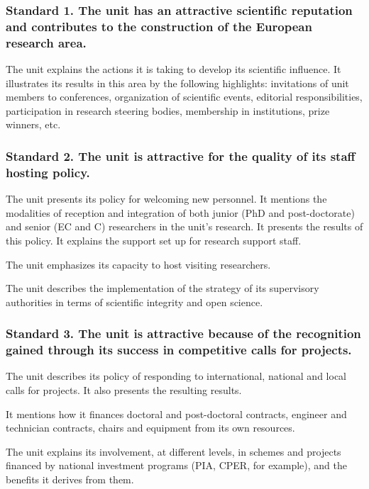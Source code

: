 \subsubsection*{Standard 1. The unit has an attractive scientific reputation and
contributes to the construction of the European research area.%
}

\begin{hceresinstructions}
  The unit explains the actions it is taking to develop its scientific
  influence. It illustrates its results in this area by the following
  highlights: invitations of unit members to conferences, organization of
  scientific events, editorial responsibilities, participation in research
  steering bodies, membership in institutions, prize winners, etc.
\end{hceresinstructions}

\subsubsection*{Standard 2. The unit is attractive for the quality of its staff
hosting policy.}

\begin{hceresinstructions}
  The unit presents its policy for welcoming new personnel. It mentions
  the modalities of reception and integration of both junior (PhD and
  post-doctorate) and senior (EC and C) researchers in the
  unit's research. It presents the results of this policy.
  It explains the support set up for research support staff.

  The unit emphasizes its capacity to host visiting researchers.

  The unit describes the implementation of the strategy of its supervisory
  authorities in terms of scientific integrity and open science.
\end{hceresinstructions}

\subsubsection*{Standard 3. The unit is attractive because of the recognition
gained through its success in competitive calls for projects.%
}

\begin{hceresinstructions}
  The unit describes its policy of responding to international, national
  and local calls for projects. It also presents the resulting results.

  It mentions how it finances doctoral and post-doctoral contracts,
  engineer and technician contracts, chairs and equipment from its own
  resources.

  The unit explains its involvement, at different levels, in schemes and
  projects financed by national investment programs (PIA, CPER, for
  example), and the benefits it derives from them.
\end{hceresinstructions}


